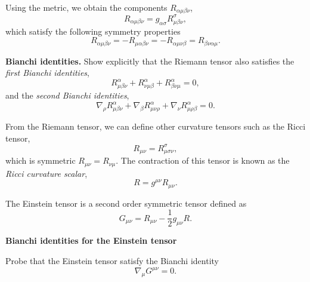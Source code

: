 Using the metric, we obtain the components $R_{\alpha \mu \beta \nu}$,
\begin{equation}
R_{\alpha \mu \beta \nu} = g_{\alpha \sigma}R^\sigma _{ \mu \beta \nu},  \label{eq:RiemannTensor2}
\end{equation}
which satisfy the following symmetry properties
\begin{equation}
R_{\alpha \mu \beta \nu} = - R_{\mu \alpha \beta \nu} =- R_{\alpha \mu \nu \beta} = R_{ \beta \nu \alpha \mu}.
\end{equation}

\begin{exercise}
\textbf{Bianchi identities.}
Show explicitly that the Riemann tensor also satisfies the \textit{first Bianchi identities},
\begin{equation}
R^\alpha_{\mu \beta \nu}+ R^\alpha_{\nu \mu \beta} + R^\alpha_{ \beta \nu \mu}=0,
\end{equation}
and the \textit{second Bianchi identities},
\begin{equation}
\nabla_\rho R^\alpha_{\mu \beta \nu} + \nabla_\beta R^\alpha_{\mu  \nu \rho} + \nabla_\nu R^\alpha_{\mu \rho \beta} = 0.
\end{equation}
\end{exercise}

From the Riemann tensor, we can define other curvature tensors such as the Ricci tensor,
\begin{equation}
R_{\mu \nu} = R^\sigma_{\mu \sigma \nu},
\end{equation}
which is symmetric $R_{\mu \nu} = R_{\nu \mu}$. The contraction of this tensor is known as the \textit{Ricci curvature scalar},
\begin{equation}
R=g^{\mu \nu} R_{\mu \nu}.
\end{equation}

The Einstein tensor is a second order symmetric tensor defined as
\begin{equation}
G_{\mu \nu} = R_{\mu \nu} - \frac{1}{2} g_{\mu \nu} R.
\end{equation}

\begin{exercise}
\textbf{Bianchi identities for the Einstein tensor}

Probe that the Einstein tensor satisfy the Bianchi identity
\begin{equation}
\nabla _\mu G^{\mu \nu} = 0. \label{eq:BianchiIdentitiesG}
\end{equation}
\end{exercise}

